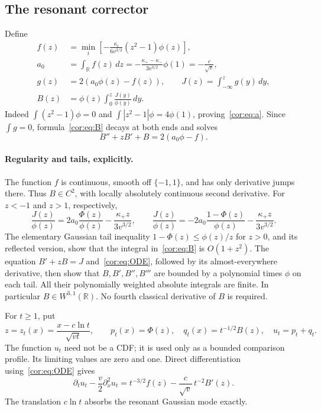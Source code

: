 \documentclass[11pt,a4paper]{article}
\theoremstyle{definition}\newtheorem{definition}[theorem]{Definition}
\theoremstyle{remark}\newtheorem{remark}[theorem]{Remark}
\newcommand{\R}{\mathbb R}
\numberwithin{equation}{section}
\begin{document}
\subsection{The resonant corrector}
Define
\begin{align}
 f(z)&=\min_i\left[-\frac{\kappa_i}{6v^{3/2}}
                      (z^2-1)\phi(z)\right],\label{cor:eq:forcing}\\
 a_0&=\int_\R f(z)\,dz=-\frac{\kappa_+-\kappa_-}{3v^{3/2}}\phi(1)
       =-\frac{c}{\sqrt v},\label{cor:eq:a}\\
 g(z)&=2(a_0\phi(z)-f(z)),\qquad
 J(z)=\int_{-\infty}^z g(y)\,dy,\label{cor:eq:J}\\
 B(z)&=\phi(z)\int_0^z\frac{J(y)}{\phi(y)}\,dy.\label{cor:eq:B}
\end{align}
Indeed $\int(z^2-1)\phi=0$ and
$\int|z^2-1|\phi=4\phi(1)$, proving~\eqref{cor:eq:a}.
Since $\int g=0$, formula~\eqref{cor:eq:B} decays at both ends and solves
\begin{equation}\label{cor:eq:ODE}
 B''+zB'+B=2(a_0\phi-f).
\end{equation}

\paragraph{Regularity and tails, explicitly.}
The function $f$ is continuous, smooth off $\{-1,1\}$, and has only
derivative jumps there. Thus $B\in C^2$, with locally absolutely
continuous second derivative. For $z<-1$ and $z>1$, respectively,
\[
 \frac{J(z)}{\phi(z)}=
 2a_0\frac{\Phi(z)}{\phi(z)}-\frac{\kappa_+z}{3v^{3/2}},
 \qquad
 \frac{J(z)}{\phi(z)}=
 -2a_0\frac{1-\Phi(z)}{\phi(z)}-\frac{\kappa_+z}{3v^{3/2}}.
\]
The elementary Gaussian tail inequality
$1-\Phi(z)\le\phi(z)/z$ for $z>0$, and its reflected version,
show that the integral in~\eqref{cor:eq:B} is $O(1+z^2)$.
The equation $B'+zB=J$ and~\eqref{cor:eq:ODE}, followed by its
almost-everywhere derivative, then show that $B,B',B'',B'''$ are
bounded by a polynomial times $\phi$ on each tail. All their
polynomially weighted absolute integrals are finite. In particular
$B\in W^{3,1}(\R)$. No fourth classical derivative of $B$ is required.

For $t\ge1$, put
\begin{equation}\label{cor:eq:profile}
 z=z_t(x)=\frac{x-c\ln t}{\sqrt{vt}},\qquad
 p_t(x)=\Phi(z),\quad q_t(x)=t^{-1/2}B(z),\quad u_t=p_t+q_t.
\end{equation}
The function $u_t$ need not be a CDF; it is used only as a bounded
comparison profile. Its limiting values are zero and one. Direct
differentiation using~\eqref{cor:eq:ODE} gives
\begin{equation}\label{cor:eq:PDE}
 \partial_tu_t-\frac v2\partial_x^2u_t
 =t^{-3/2}f(z)-\frac{c}{\sqrt v}\,t^{-2}B'(z).
\end{equation}
The translation $c\ln t$ absorbs the resonant Gaussian mode exactly.
\end{document}
